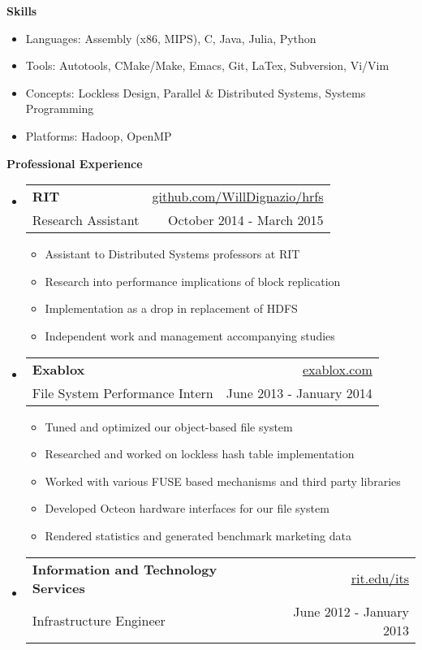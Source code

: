\documentclass[letterpaper,11pt]{article}
\makeatletter
\newcommand{\resheading}[1]{{\large \colorbox{mygrey}{\begin{minipage}{\textwidth}{\textbf{#1 \vphantom{p\^{E}}}}\end{minipage}}}}
\newcommand{\ressubheading}[4]{
\begin{tabular*}{6.5in}{l@{\extracolsep{\fill}}r}
		\textbf{#1} & #2 \\
		{#3} & {#4} \\
\end{tabular*}\vspace{-6pt}}
\makeatother
\begin{document}
\resheading{{Skills}}
{ \footnotesize
		\begin{itemize}
			\item{Languages: Assembly (x86, MIPS), C, Java, Julia, Python}
			\item{Tools: Autotools, CMake/Make, Emacs, Git, LaTex, Subversion, Vi/Vim}
			\item{Concepts: Lockless Design, Parallel \& Distributed Systems, Systems Programming}
			\item{Platforms: Hadoop, OpenMP}
		\end{itemize}
}
\resheading{Professional Experience}
{\footnotesize
	\begin{itemize}
			\item
			\ressubheading{RIT}{\href{https://www.github.com/WillDignazio/hrfs}{github.com/WillDignazio/hrfs}}{Research Assistant}{October 2014 - March 2015}
			{ \footnotesize
				\begin{itemize}
					\item{Assistant to Distributed Systems professors at RIT}
					\item{Research into performance implications of block replication}
					\item{Implementation as a drop in replacement of HDFS}
					\item{Independent work and management accompanying studies}
				\end{itemize}
			}
			\item
			\ressubheading{Exablox}{\href{http://www.exablox.com/}{exablox.com}}{File System Performance Intern}{June 2013 - January 2014}
			{ \footnotesize
				\begin{itemize}
					\item{Tuned and optimized our object-based file system}
					\item{Researched and worked on lockless hash table implementation}
					\item{Worked with various FUSE based mechanisms and third party libraries}
					\item{Developed Octeon hardware interfaces for our file system}
					\item{Rendered statistics and generated benchmark marketing data}
				\end{itemize}
			}
			\item 
			\ressubheading{Information and Technology Services}{\href{http://www.rit.edu/its/}{rit.edu/its}}{Infrastructure Engineer}{June 2012 - January 2013}
			{ \footnotesize
				\begin{itemize}

\end{itemize}}
\end{itemize}}
\end{document}
